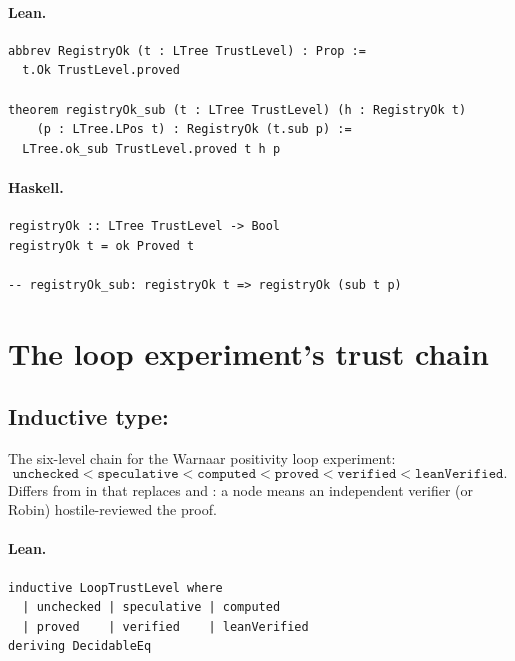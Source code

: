 \documentclass[11pt,a4paper]{article}
\begin{document}
\paragraph{Lean.}
\begin{lstlisting}[style=lean]
abbrev RegistryOk (t : LTree TrustLevel) : Prop :=
  t.Ok TrustLevel.proved

theorem registryOk_sub (t : LTree TrustLevel) (h : RegistryOk t)
    (p : LTree.LPos t) : RegistryOk (t.sub p) :=
  LTree.ok_sub TrustLevel.proved t h p
\end{lstlisting}

\paragraph{Haskell.}
\begin{lstlisting}[style=haskell]
registryOk :: LTree TrustLevel -> Bool
registryOk t = ok Proved t

-- registryOk_sub: registryOk t => registryOk (sub t p)
\end{lstlisting}

\section{The loop experiment's trust chain}

\subsection{Inductive type: }

\begin{defn}
The six-level chain for the Warnaar positivity loop experiment:
\[
  \mathtt{unchecked} < \mathtt{speculative} < \mathtt{computed} <
  \mathtt{proved} < \mathtt{verified} < \mathtt{leanVerified}.
\]
Differs from  in that  replaces
 and : a  node means an
independent verifier (or Robin) hostile-reviewed the proof.
\end{defn}

\paragraph{Lean.}
\begin{lstlisting}[style=lean]
inductive LoopTrustLevel where
  | unchecked | speculative | computed
  | proved    | verified    | leanVerified
deriving DecidableEq
\end{lstlisting}
\end{document}
